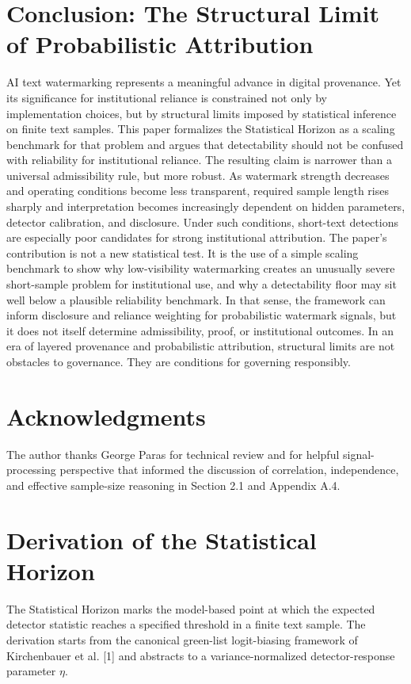 \documentclass[11pt]{article}
\begin{document}
\section{Conclusion: The Structural Limit of Probabilistic Attribution}
AI text watermarking represents a meaningful advance in digital provenance. Yet its
significance for institutional reliance is constrained not only by implementation
choices, but by structural limits imposed by statistical inference on finite text
samples. This paper formalizes the Statistical Horizon as a scaling benchmark for
that problem and argues that detectability should not be confused with reliability for
institutional reliance.
The resulting claim is narrower than a universal admissibility rule, but more robust.
As watermark strength decreases and operating conditions become less transparent,
required sample length rises sharply and interpretation becomes increasingly
dependent on hidden parameters, detector calibration, and disclosure. Under such
conditions, short-text detections are especially poor candidates for strong
institutional attribution.
The paper's contribution is not a new statistical test. It is the use of a simple
scaling benchmark to show why low-visibility watermarking creates an unusually severe
short-sample problem for institutional use, and why a detectability floor may sit well
below a plausible reliability benchmark. In that sense, the framework can inform
disclosure and reliance weighting for probabilistic watermark signals, but it does not
itself determine admissibility, proof, or institutional outcomes.
In an era of layered provenance and probabilistic attribution, structural limits are
not obstacles to governance. They are conditions for governing responsibly.
\section*{Acknowledgments}
The author thanks George Paras for technical review and for helpful signal-processing
perspective that informed the discussion of correlation, independence, and effective
sample-size reasoning in Section 2.1 and Appendix A.4.
\appendix
\section{Derivation of the Statistical Horizon}
The Statistical Horizon marks the model-based point at which the expected detector
statistic reaches a specified threshold in a finite text sample. The derivation
starts from the canonical green-list logit-biasing framework of Kirchenbauer et al.
[1] and abstracts to a variance-normalized detector-response parameter $\eta$.
\end{document}
